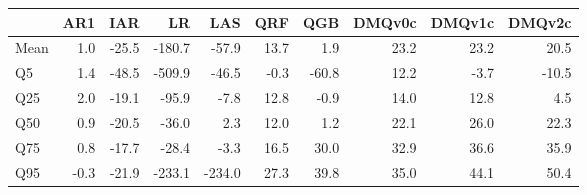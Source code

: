 \begin{tabular}{lrrrrrrrrr}
\toprule
 & AR1 & IAR & LR & LAS & QRF & QGB & DMQv0c & DMQv1c & DMQv2c \\
\midrule
Mean & 1.0 & -25.5 & -180.7 & -57.9 & 13.7 & 1.9 & 23.2 & 23.2 & 20.5 \\
Q5 & 1.4 & -48.5 & -509.9 & -46.5 & -0.3 & -60.8 & 12.2 & -3.7 & -10.5 \\
Q25 & 2.0 & -19.1 & -95.9 & -7.8 & 12.8 & -0.9 & 14.0 & 12.8 & 4.5 \\
Q50 & 0.9 & -20.5 & -36.0 & 2.3 & 12.0 & 1.2 & 22.1 & 26.0 & 22.3 \\
Q75 & 0.8 & -17.7 & -28.4 & -3.3 & 16.5 & 30.0 & 32.9 & 36.6 & 35.9 \\
Q95 & -0.3 & -21.9 & -233.1 & -234.0 & 27.3 & 39.8 & 35.0 & 44.1 & 50.4 \\
\bottomrule
\end{tabular}
